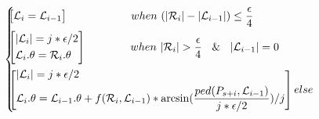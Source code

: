 \begin{small}
\vspace{-2ex}
\begin{equation*}
\label{equ-function}
\hspace{-1.5ex}\left\{
    \begin{aligned}
        &\hspace{-1.5ex}\left[
            \begin{aligned}
            & \mathcal{L}_{i} = \mathcal{L}_{i-1}\\
            \end{aligned}
        \right]\hspace{12.5ex}~when~(|\mathcal{R}_{i}| - |\mathcal{L}_{i-1}|) \le \frac{\epsilon}{4}   \\
        &\hspace{-1.5ex}\left[
            \begin{aligned}
            & |\mathcal{L}_{i}|  = j*{\epsilon}/{2} \\
            & \mathcal{L}_{i}.\theta = \mathcal{R}_{i}.\theta    \\
            \end{aligned}
        \right]\hspace{8.5ex}~when~|\mathcal{R}_{i}| >  \frac{\epsilon}{4}~\And~|\mathcal{L}_{i-1}|=0    \\
        &\hspace{-1.5ex}\left[
            \begin{aligned}
            & |\mathcal{L}_{i}|  = j*{\epsilon}/{2}\\
            & \mathcal{L}_{i}.\theta = \mathcal{L}_{i-1}.\theta + f(\mathcal{R}_i,\mathcal{L}_{i-1})*\arcsin(\frac{ped(P_{s+i}, \mathcal{L}_{i-1})}{j*\epsilon/2})/j \\	
            \end{aligned}
        \right]\hspace{0ex}else\\
    \end{aligned}
    \right.
\end{equation*}
\vspace{-2ex}
\end{small}


